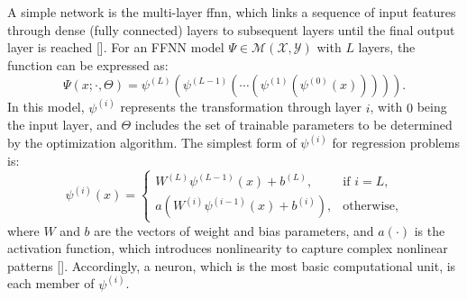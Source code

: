 \documentclass[12pt,a4paper]{report}
\begin{document}
A simple network is the multi-layer \ac{ffnn}, which links a sequence of input features through dense (fully connected) layers to subsequent layers until the final output layer is reached [\cite{rumelhart1986}]. For an FFNN model $\Psi \in \mathcal{M}\left ( \mathcal{X},\mathcal{Y} \right )$ with $L$ layers, the function can be expressed as:
%
\begin{equation}\label{eq-ffnn}
\Psi (x; \cdot, \Theta )= \psi^{(L)} \left( \psi^{(L-1)} \left(\cdots \left(\psi^{(1)} \left( \psi^{(0)} \left(x \right ) \right ) \right )\right )\right ).
\end{equation}
%
In this model, $\psi^{(i)}$ represents the transformation through layer $i$, with $0$ being the input layer, and $\Theta$ includes the set of trainable parameters to be determined by the optimization algorithm. The simplest form of $\psi^{(i)}$ for regression problems is:
%
\begin{equation}\label{eq-layer}
    \psi^{(i)}(x) = \begin{cases}
        W^{(L)}\psi^{(L-1)}(x) + b^{(L)}, & \text{if } i = L, \\ 
        a \left( W^{(i)}\psi^{(i-1)}(x) + b^{(i)} \right), & \text{otherwise},
    \end{cases}
\end{equation}
%
where $W$ and $b$ are the vectors of weight and bias parameters, and $a(\cdot)$ is the activation function, which introduces nonlinearity to capture complex nonlinear patterns [\cite{berner2022}]. Accordingly, a neuron, which is the most basic computational unit, is each member of $\psi^{(i)}$.
\end{document}

